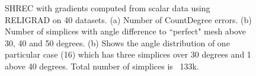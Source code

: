 \begin{figure}[tb]
	\caption{SHREC with gradients computed from scalar data using RELIGRAD on 40 datasets. (a) Number of CountDegree errors. (b) Number of simplices with angle difference to ``perfect" mesh above 30, 40 and 50 degrees. (b) Shows the angle distribution of one particular case (16) which has three simplices over 30 degrees and 1 above 40 degrees. Total number of simplices is ~133k.}\label{fig:flangeAngle}
\end{figure}
